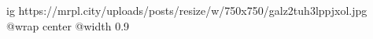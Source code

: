  
 
 
 
 

\ifcmt
  ig https://mrpl.city/uploads/posts/resize/w/750x750/galz2tuh3lppjxol.jpg
  @wrap center
  @width 0.9
\fi
